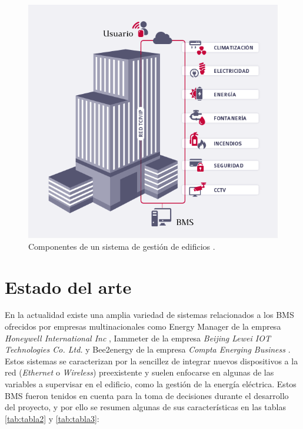 \vspace{1cm}
\begin{figure}[htbp]
\centering
\includegraphics[width=.8\textwidth]{./Figures/bms3.png}
\caption{Componentes de un sistema de gestión de edificios \protect\footnotemark .}
\label{fig:bms}
\end{figure}


\section{Estado del arte}
En la actualidad existe una amplia variedad de sistemas relacionados a los BMS ofrecidos por empresas multinacionales como Energy Manager de la empresa \emph{Honeywell International Inc} \citep{WEBSITE:35}, Iammeter de la empresa \emph{Beijing Lewei IOT Technologies Co. Ltd.} \citep{WEBSITE:36} y Bee2energy de la empresa \emph{Compta Energing Business} \citep{WEBSITE:37}. Estos sistemas se caracterizan por la sencillez de integrar nuevos dispositivos a la red (\emph{Ethernet} o \emph{Wireless}) preexistente y suelen enfocarse en algunas de las variables a supervisar en el edificio, como la gestión de la energía eléctrica. Estos BMS fueron tenidos en cuenta para la toma de decisiones durante el desarrollo del proyecto, y por ello se resumen algunas de sus características en las tablas \ref{tab:tabla2} y \ref{tab:tabla3}:



